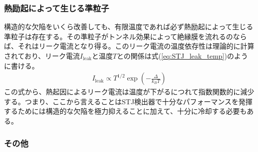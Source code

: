 		\subsubsection{熱励起によって生じる準粒子}
		構造的な欠陥をいくら改善しても、有限温度であれば必ず熱励起によって生じる準粒子は存在する。その準粒子がトンネル効果によって絶縁膜を流れるのならば、それはリーク電流となり得る。このリーク電流の温度依存性は理論的に計算されており、リーク電流$I_{\mathrm{leak}}$と温度$T$との関係は式(\ref{eq:STJ_leak_temp})のように書ける。\cite{13}
		\begin{eqnarray}
			I_{\mathrm{leak}} \propto T^{1/2} \exp \left(- \frac{\Delta}{k_{B}T} \right)
			\label{eq:STJ_leak_temp}
		\end{eqnarray}
		この式から、熱起因によるリーク電流は温度が下がるにつれて指数関数的に減少する。つまり、ここから言えることはSTJ検出器で十分なパフォーマンスを発揮するためには構造的な欠陥を極力抑えることに加えて、十分に冷却する必要もある。
		
		\subsubsection{その他}	
	
